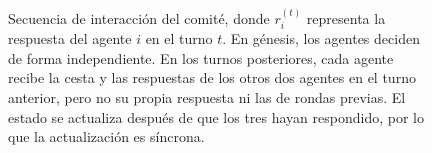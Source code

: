 \begin{figure}[htbp]
	
	\caption[Protocolo de deliberación]{
		Secuencia de interacción del comité, donde $r_i^{(t)}$
		representa la respuesta del agente $i$ en el turno $t$.
		En génesis, los agentes deciden de forma independiente.
		En los turnos posteriores, cada agente recibe la cesta y
		las respuestas de los otros dos agentes en el turno anterior,
		pero no su propia respuesta ni las de rondas previas.
		El estado se actualiza después de que los tres hayan respondido,
		por lo que la actualización es síncrona.
	}
	\label{fig:protocolo_deliberacion}
\end{figure}